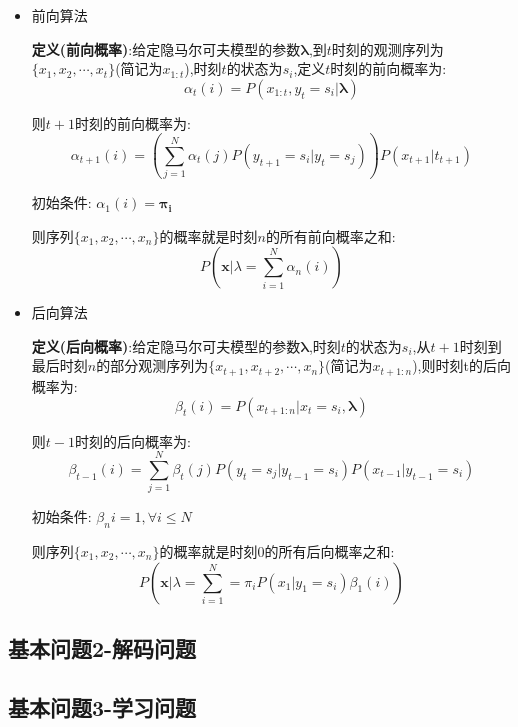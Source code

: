 \documentclass[UTF8,a4paper]{ctexart}%
\begin{document}
            \begin{itemize}
              \item 前向算法

                  \textbf{定义(前向概率)}:给定隐马尔可夫模型的参数$\bm{\lambda}$,到$t$时刻的观测序列为$\{x_1,x_2 , \cdots , x_t\}$(简记为$x_{1:t}$),时刻$t$的状态为$s_i$,定义$t$时刻的前向概率为:
                  \begin{equation}
                    \alpha_t(i) = P(x_{1:t},y_t = s_i|\bm{\lambda})
                  \end{equation}

                  则$t+1$时刻的前向概率为:
                  \begin{equation}
                    \alpha_{t+1}(i) = \left ( \sum_{j =1}^N \alpha_t(j)P(y_{t+1} = s_i|y_t = s_j) \right ) P(x_{t+1}|t_{t+1})
                  \end{equation}

                  初始条件:
                  $\alpha_1(i) = \bm{\pi_i}$

                  则序列$\{x_1,x_2 , \cdots , x_n\}$的概率就是时刻$n$的所有前向概率之和:
                  \begin{equation}
                    P(\bm{x}|\lambda = \sum_{i = 1}^N \alpha_n(i))
                  \end{equation}

              \item 后向算法

                  \textbf{定义(后向概率)}:给定隐马尔可夫模型的参数$\bm{\lambda}$,时刻$t$的状态为$s_i$,从$t+1$时刻到最后时刻$n$的部分观测序列为$\{x_{t+1},x_{t+2} , \cdots , x_n\}$(简记为$x_{t+1:n}$),则时刻t的后向概率为:
                  \begin{equation}
                    \beta_t(i) = P(x_{t+1:n}|x_t = s_i , \bm{\lambda})
                  \end{equation}

                  则$t-1$时刻的后向概率为:
                  \begin{equation}
                    \beta_{t-1}(i) = \sum_{j = 1}^N \beta_{t}(j)P(y_{t} = s_j|y_{t-1} = s_i)P(x_{t-1}|y_{t-1} = s_i)
                  \end{equation}

                  初始条件:
                  $\beta_n{i} = 1,\forall i \leqslant N$

                  则序列$\{x_1,x_2 , \cdots , x_n\}$的概率就是时刻$0$的所有后向概率之和:
                  \begin{equation}
                    P(\bm{x}|\lambda = \sum_{i = 1}^N = \pi_iP(x_1|y_1 = s_i)\beta_1(i))
                  \end{equation}

            \end{itemize}


        \subsection{基本问题2-解码问题}
        \subsection{基本问题3-学习问题}
\end{document}
